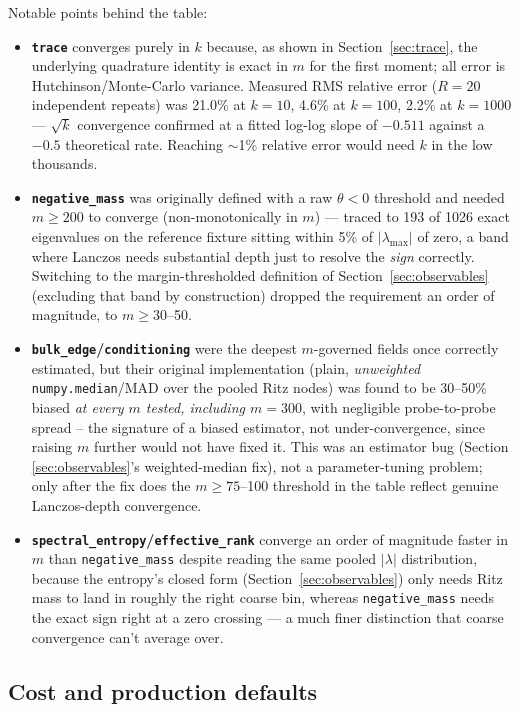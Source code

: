\documentclass[11pt]{article}
\newcommand{\code}[1]{\texttt{#1}}
\begin{document}
Notable points behind the table:
\begin{itemize}
\item \textbf{\code{trace}} converges purely in \(k\) because, as shown in
Section~\ref{sec:trace}, the underlying quadrature identity is exact in
\(m\) for the first moment; all error is Hutchinson/Monte-Carlo variance.
Measured RMS relative error (\(R=20\) independent repeats) was 21.0\% at
\(k{=}10\), 4.6\% at \(k{=}100\), 2.2\% at \(k{=}1000\) --- \(\sqrt{k}\)
convergence confirmed at a fitted log-log slope of \(-0.511\) against a
\(-0.5\) theoretical rate. Reaching \(\sim\)1\% relative error would need
\(k\) in the low thousands.
\item \textbf{\code{negative_mass}} was originally defined with a raw
\(\theta<0\) threshold and needed \(m \ge 200\) to converge (non-monotonically
in \(m\)) --- traced to 193 of 1026 exact eigenvalues on the reference
fixture sitting within 5\% of \(|\lambda_{\max}|\) of zero, a band where
Lanczos needs substantial depth just to resolve the \emph{sign} correctly.
Switching to the margin-thresholded definition of
Section~\ref{sec:observables} (excluding that band by construction) dropped
the requirement an order of magnitude, to \(m\ge30\)--50.
\item \textbf{\code{bulk_edge}/\code{conditioning}} were the deepest
\(m\)-governed fields once correctly estimated, but their original
implementation (plain, \emph{unweighted} \code{numpy.median}/MAD over the
pooled Ritz nodes) was found to be 30--50\% biased \emph{at every \(m\)
tested, including \(m{=}300\)}, with negligible probe-to-probe spread --
the signature of a biased estimator, not under-convergence, since raising
\(m\) further would not have fixed it. This was an estimator bug (Section
\ref{sec:observables}'s weighted-median fix), not a parameter-tuning
problem; only after the fix does the \(m\ge75\)--100 threshold in the table
reflect genuine Lanczos-depth convergence.
\item \textbf{\code{spectral_entropy}/\code{effective_rank}} converge an
order of magnitude faster in \(m\) than \code{negative_mass} despite
reading the same pooled \(|\lambda|\) distribution, because the entropy's
closed form (Section~\ref{sec:observables}) only needs Ritz mass to land in
roughly the right coarse bin, whereas \code{negative_mass} needs the exact
sign right at a zero crossing --- a much finer distinction that coarse
convergence can't average over.
\end{itemize}

\subsection{Cost and production defaults}
\end{document}
